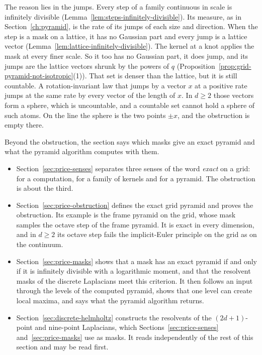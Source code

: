 The reason lies in the jumps. Every step of a family continuous in scale is infinitely divisible
(Lemma~\ref{lem:steps-infinitely-divisible}). Its \Levy{} measure, as in
Section~\ref{ch:pyramid}, is the rate of its jumps of each size and direction. When the step is a
mask on a lattice, it has no Gaussian part and every jump is a lattice vector
(Lemma~\ref{lem:lattice-infinitely-divisible}). The kernel at a knot applies the mask at every finer
scale. So it too has no Gaussian part, it does jump, and its jumps are the lattice vectors shrunk
by the powers of $q$ (Proposition~\ref{prop:grid-pyramid-not-isotropic}(1)). That set is denser
than the lattice, but it is still countable. A rotation-invariant law that jumps by a vector $x$ at
a positive rate jumps at the same rate by every vector of the length of $x$. In $d \ge 2$ those
vectors form a sphere, which is uncountable, and a countable set cannot hold a sphere of such
atoms. On the line the sphere is the two points $\pm x$, and the obstruction is empty there.

Beyond the obstruction, the section says which masks give an exact pyramid and what the pyramid
algorithm computes with them.
\begin{itemize}
\item Section~\ref{sec:price-senses} separates three senses of the word \emph{exact} on a grid: for
a computation, for a family of kernels and for a pyramid. The obstruction is about the third.
\item Section~\ref{sec:price-obstruction} defines the exact grid pyramid and proves the
obstruction. Its example is the frame \Matern{} pyramid on the grid, whose mask samples the octave
step of the frame \Matern{} pyramid. It is exact in every dimension, and in $d \ge 2$ its octave
step fails the implicit-Euler principle on the grid as on the continuum.
\item Section~\ref{sec:price-masks} shows that a mask has an exact pyramid if and only if it is
infinitely divisible with a logarithmic moment, and that the resolvent masks of the discrete
Laplacians meet this criterion. It then follows an input through the levels of the computed
pyramid, shows that one level can create local maxima, and says what the pyramid algorithm returns.
\item Section~\ref{sec:discrete-helmholtz} constructs the resolvents of the $(2d+1)$-point and
nine-point Laplacians, which Sections~\ref{sec:price-senses} and~\ref{sec:price-masks} use as masks.
It reads independently of the rest of this section and may be read first.
\end{itemize}


